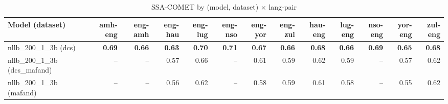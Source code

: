 \begin{table}[t]
\centering
\caption{SSA-COMET by (model, dataset) × lang-pair}
\begin{tabular}{lrrrrrrrrrrrr}
\toprule
Model (dataset) & amh-eng & eng-amh & eng-hau & eng-lug & eng-nso & eng-yor & eng-zul & hau-eng & lug-eng & nso-eng & yor-eng & zul-eng \\
\midrule
nllb\_200\_1\_3b (dcs) & \textbf{0.69} & \textbf{0.66} & \textbf{0.63} & \textbf{0.70} & \textbf{0.71} & \textbf{0.67} & \textbf{0.66} & \textbf{0.68} & \textbf{0.66} & \textbf{0.69} & \textbf{0.65} & \textbf{0.68} \\
nllb\_200\_1\_3b (dcs\_mafand) & -- & -- & 0.57 & 0.66 & -- & 0.61 & 0.59 & 0.62 & 0.59 & -- & 0.57 & 0.62 \\
nllb\_200\_1\_3b (mafand) & -- & -- & 0.56 & 0.62 & -- & 0.58 & 0.59 & 0.61 & 0.58 & -- & 0.55 & 0.62 \\
\bottomrule
\end{tabular}
\end{table}